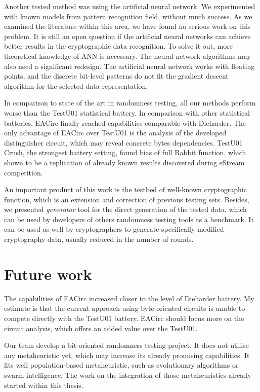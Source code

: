 \documentclass[
    digital,    %
    oneside,    %
    color,
    11pt,
    nocover,
    notable,
    nolof,
    nolot,
]{fithesis3}
\begin{document}
Another tested method was using the artificial neural network. We experimented with known models from pattern recognition field, without much success. As we examined the literature within this area, we have found no serious work on this problem. It is still an open question if the artificial neural networks can achieve better results in the cryptographic data recognition. To solve it out, more theoretical knowledge of ANN is necessary. The neural network algorithms may also need a significant redesign. The artificial neural network works with floating points, and the discrete bit-level patterns do not fit the gradient descent algorithm for the selected data representation.

In comparison to state of the art in randomness testing, all our methods perform worse than the TestU01 statistical battery. In comparison with other statistical batteries, EACirc finally reached capabilities comparable with Dieharder. The only advantage of EACirc over TestU01 is the analysis of the developed distinguisher circuit, which may reveal concrete bytes dependencies. TestU01 Crush, the strongest battery setting, found bias of full Rabbit function, which shown to be a replication of already known results discovered during eStream competition.

An important product of this work is the testbed of well-known cryptographic function, which is an extension and correction of previous testing sets. Besides, we presented \textit{generator} tool for the direct generation of the tested data, which can be used by developers of others randomness testing tools as a benchmark. It can be used as well by cryptographers to generate specifically modified cryptography data, usually reduced in the number of rounds.

\section{Future work}
\label{sec:conclusion-future}

The capabilities of EACirc increased closer to the level of Dieharder battery. My estimate is that the current approach using byte-oriented circuits is unable to compete directly with the TestU01 battery. EACirc should focus more on the circuit analysis, which offers an added value over the TestU01.

Our team develop a bit-oriented randomness testing project. It does not utilise any metaheuristic yet, which may increase its already promising capabilities. It fits well population-based metaheuristic, such as evolutionary algorithms or swarm intelligence. The work on the integration of those metaheuristics already started within this thesis.
\end{document}
